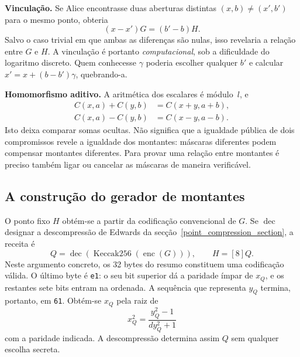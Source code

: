 \textbf{Vinculação.} Se Alice encontrasse duas aberturas distintas
\((x,b)\ne(x',b')\) para o mesmo ponto, obteria
\[
 (x-x')G=(b'-b)H.
\]
Salvo o caso trivial em que ambas as diferenças são nulas, isso revelaria a
relação entre \(G\) e \(H\). A vinculação é portanto \emph{computacional}, sob
a dificuldade do logaritmo discreto. Quem
conhecesse \(\gamma\) poderia escolher qualquer \(b'\) e calcular
\(x'=x+(b-b')\gamma\), quebrando-a.

\textbf{Homomorfismo aditivo.} A aritmética dos escalares é módulo~\(l\), e
\begin{align}
 C(x,a)+C(y,b)&=C(x+y,a+b),\label{eq:commitment-addition}\\
 C(x,a)-C(y,b)&=C(x-y,a-b).\label{eq:commitment-subtraction}
\end{align}
Isto deixa comparar somas ocultas. Não significa que a igualdade pública de
dois compromissos revele a igualdade dos montantes: máscaras diferentes podem
compensar montantes diferentes. Para provar uma relação entre montantes é
preciso também ligar ou cancelar as máscaras de maneira verificável.

\subsection{A construção do gerador de montantes}
\label{subsec:pedersen-fixed-generator}

%
O ponto fixo \(H\) obtém-se a partir da codificação convencional de \(G\).
Se \(\operatorname{dec}\) designar a descompressão de Edwards da
secção~\ref{point_compression_section}, a receita é
\begin{equation}
 Q=\operatorname{dec}\!\left(
           \operatorname{Keccak256}(\operatorname{enc}(G))\right),
 \qquad H=[8]Q.
 \label{eq:pedersen-fixed-generator}
\end{equation}
Neste argumento concreto, os 32 bytes do resumo constituem uma codificação
válida. O último byte é \texttt{e1}: o seu bit superior dá a paridade
ímpar de \(x_Q\), e os restantes sete bits entram na ordenada. A sequência
que representa \(y_Q\) termina, portanto, em \texttt{61}.
Obtém-se \(x_Q\) pela raiz de
\[
 x_Q^2=\frac{y_Q^2-1}{dy_Q^2+1}
\]
com a paridade indicada. A descompressão determina assim \(Q\) sem qualquer
escolha secreta.

